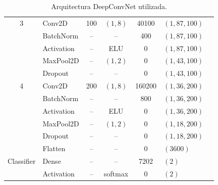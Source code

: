\begin{table}[htbp]
\begin{tabular}{clcccll}
        3              & Conv2D         & 100                 & \((1,8)\)     & 40100              & \((1, 87, 100)\)  \\

                       & BatchNorm      & --                  & --            & 400                & \((1, 87, 100)\)  \\

                       & Activation     & --                  & ELU           & 0                  & \((1, 87, 100)\)  \\

                       & MaxPool2D      & --                  & \((1,2)\)     & 0                  & \((1, 43, 100)\)  \\

                       & Dropout        & --                  & --            & 0                  & \((1, 43, 100)\)  \\
        \midrule

        4              & Conv2D         & 200                 & \((1,8)\)     & 160200             & \((1, 36, 200)\)  \\

                       & BatchNorm      & --                  & --            & 800                & \((1, 36, 200)\)  \\

                       & Activation     & --                  & ELU           & 0                  & \((1, 36, 200)\)  \\

                       & MaxPool2D      & --                  & \((1,2)\)     & 0                  & \((1, 18, 200)\)  \\

                       & Dropout        & --                  & --            & 0                  & \((1, 18, 200)\)  \\

                       & Flatten        & --                  & --            & 0                  & \((3600)\)        \\
        \midrule

        Classifier     & Dense          & --                  & --            & 7202               & \((2)\)           \\

                       & Activation     & --                  & softmax       & 0                  & \((2)\)           \\

        \bottomrule
    \end{tabular}
    \caption{Arquitectura DeepConvNet utilizada.}
    \label{tab:deepconvnet_architecture}
\end{table}

